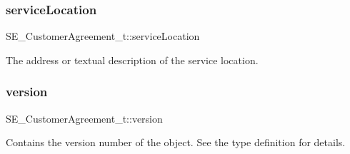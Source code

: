 \subsubsection{\texorpdfstring{service\+Location}{serviceLocation}}
{\footnotesize\ttfamily S\+E\+\_\+\+Customer\+Agreement\+\_\+t\+::service\+Location}

The address or textual description of the service location. \mbox{\label{group__CustomerAgreement_ga27de1c2c7c2da3fce841f3aa2f87b9f2}} 
\subsubsection{\texorpdfstring{version}{version}}
{\footnotesize\ttfamily S\+E\+\_\+\+Customer\+Agreement\+\_\+t\+::version}

Contains the version number of the object. See the type definition for details. 